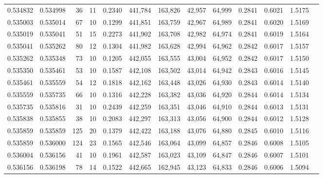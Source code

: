 \begin{tabular}{rrrrrrrrrrrrr}
0.534832 & 0.534998 &    36 &  11 &                                     0.2340 & 441,784 & 163,826 &  42,957 &  64,999 & 0.2841 & 0.6021 & 1.5175 \\
0.535003 & 0.535014 &    67 &  10 &                                     0.1299 & 441,851 & 163,759 &  42,967 &  64,989 & 0.2841 & 0.6020 & 1.5169 \\
0.535019 & 0.535041 &    51 &  15 &                                     0.2273 & 441,902 & 163,708 &  42,982 &  64,974 & 0.2841 & 0.6019 & 1.5164 \\
0.535041 & 0.535262 &    80 &  12 &                                     0.1304 & 441,982 & 163,628 &  42,994 &  64,962 & 0.2842 & 0.6017 & 1.5157 \\
0.535262 & 0.535348 &    73 &  10 &                                     0.1205 & 442,055 & 163,555 &  43,004 &  64,952 & 0.2842 & 0.6017 & 1.5150 \\
0.535350 & 0.535461 &    53 &  10 &                                     0.1587 & 442,108 & 163,502 &  43,014 &  64,942 & 0.2843 & 0.6016 & 1.5145 \\
0.535461 & 0.535559 &    54 &  12 &                                     0.1818 & 442,162 & 163,448 &  43,026 &  64,930 & 0.2843 & 0.6014 & 1.5140 \\
0.535559 & 0.535735 &    66 &  10 &                                     0.1316 & 442,228 & 163,382 &  43,036 &  64,920 & 0.2844 & 0.6014 & 1.5134 \\
0.535735 & 0.535816 &    31 &  10 &                                     0.2439 & 442,259 & 163,351 &  43,046 &  64,910 & 0.2844 & 0.6013 & 1.5131 \\
0.535838 & 0.535855 &    38 &  10 &                                     0.2083 & 442,297 & 163,313 &  43,056 &  64,900 & 0.2844 & 0.6012 & 1.5128 \\
0.535859 & 0.535859 &   125 &  20 &                                     0.1379 & 442,422 & 163,188 &  43,076 &  64,880 & 0.2845 & 0.6010 & 1.5116 \\
0.535859 & 0.536000 &   124 &  23 &                                     0.1565 & 442,546 & 163,064 &  43,099 &  64,857 & 0.2846 & 0.6008 & 1.5105 \\
0.536004 & 0.536156 &    41 &  10 &                                     0.1961 & 442,587 & 163,023 &  43,109 &  64,847 & 0.2846 & 0.6007 & 1.5101 \\
0.536156 & 0.536198 &    78 &  14 &                                     0.1522 & 442,665 & 162,945 &  43,123 &  64,833 & 0.2846 & 0.6006 & 1.5094 \\

\end{tabular}
